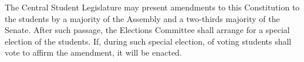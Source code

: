 
The Central Student Legislature may present amendments to this Constitution to the students by a  majority of the Assembly and a two-thirds majority of the Senate. After such passage, the Elections Committee shall arrange for a special election of the students. If, during such special election,  of voting students shall vote to affirm the amendment, it will be enacted.